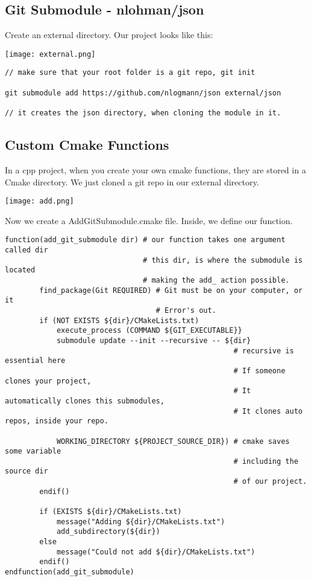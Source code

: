 \subsection{Git Submodule - nlohman/json}

Create an external directory. Our project looks like this:

\begin{center}
    \texttt{[image: external.png]}
\end{center}

\begin{verbatim}
// make sure that your root folder is a git repo, git init

git submodule add https://github.com/nlogmann/json external/json

// it creates the json directory, when cloning the module in it.
\end{verbatim}

\subsection{Custom Cmake Functions}

In a cpp project, when you create your own cmake functions, they are stored in a Cmake directory. We just cloned a 
git repo in our external directory.

\begin{center}
    \texttt{[image: add.png]}
\end{center}

Now we create a AddGitSubmodule.cmake file. Inside, we define our function.

\begin{verbatim}
function(add_git_submodule dir) # our function takes one argument called dir
                                # this dir, is where the submodule is located
                                # making the add_ action possible.
        find_package(Git REQUIRED) # Git must be on your computer, or it
                                   # Error's out.
        if (NOT EXISTS ${dir}/CMakeLists.txt)
            execute_process (COMMAND ${GIT_EXECUTABLE}}
            submodule update --init --recursive -- ${dir}
                                                     # recursive is essential here
                                                     # If someone clones your project, 
                                                     # It automatically clones this submodules,
                                                     # It clones auto repos, inside your repo.
                                                            
            WORKING_DIRECTORY ${PROJECT_SOURCE_DIR}) # cmake saves some variable
                                                     # including the source dir
                                                     # of our project.
        endif()
        
        if (EXISTS ${dir}/CMakeLists.txt)
            message("Adding ${dir}/CMakeLists.txt")
            add_subdirectory(${dir})
        else
            message("Could not add ${dir}/CMakeLists.txt")
        endif()
endfunction(add_git_submodule)
\end{verbatim}


